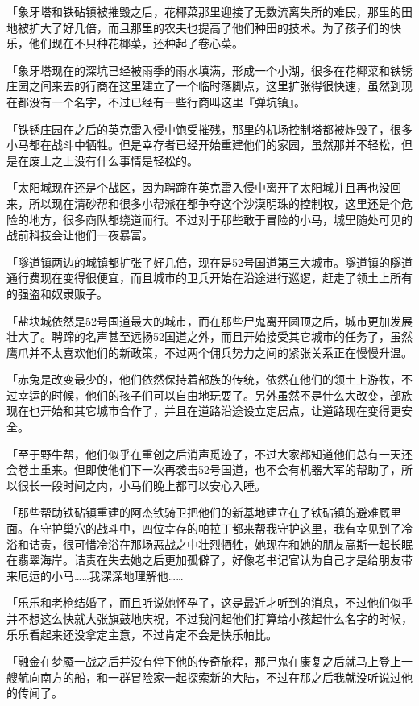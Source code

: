 {「象牙塔和铁砧镇被摧毁之后，花椰菜那里迎接了无数流离失所的难民，那里的田地被扩大了好几倍，而且那里的农夫也提高了他们种田的技术。为了孩子们的快乐，他们现在不只种花椰菜，还种起了卷心菜。

「象牙塔现在的深坑已经被雨季的雨水填满，形成一个小湖，很多在花椰菜和铁锈庄园之间来去的行商在这里建立了一个临时落脚点，这里扩张得很快速，虽然到现在都没有一个名字，不过已经有一些行商叫这里『弹坑镇』。

「铁锈庄园在之后的英克雷入侵中饱受摧残，那里的机场控制塔都被炸毁了，很多小马都在战斗中牺牲。但是幸存者已经开始重建他们的家园，虽然那并不轻松，但是在废土之上没有什么事情是轻松的。

「太阳城现在还是个战区，因为聘蹄在英克雷入侵中离开了太阳城并且再也没回来，所以现在清砂帮和很多小帮派在都争夺这个沙漠明珠的控制权，这里还是个危险的地方，很多商队都绕道而行。不过对于那些敢于冒险的小马，城里随处可见的战前科技会让他们一夜暴富。

「隧道镇两边的城镇都扩张了好几倍，现在是52号国道第三大城市。隧道镇的隧道通行费现在变得很便宜，而且城市的卫兵开始在沿途进行巡逻，赶走了领土上所有的强盗和奴隶贩子。

「盐块城依然是52号国道最大的城市，而在那些尸鬼离开圆顶之后，城市更加发展壮大了。聘蹄的名声甚至远扬52国道之外，而且开始接受其它城市的任务了，虽然鹰爪并不太喜欢他们的新政策，不过两个佣兵势力之间的紧张关系正在慢慢升温。

「赤兔是改变最少的，他们依然保持着部族的传统，依然在他们的领土上游牧，不过幸运的时候，他们的孩子们可以自由地玩耍了。另外虽然不是什么大改变，部族现在也开始和其它城市合作了，并且在道路沿途设立定居点，让道路现在变得更安全。

「至于野牛帮，他们似乎在重创之后消声觅迹了，不过大家都知道他们总有一天还会卷土重来。但即使他们下一次再袭击52号国道，也不会有机器大军的帮助了，所以很长一段时间之内，小马们晚上都可以安心入睡。

「那些帮助铁砧镇重建的阿杰铁骑卫把他们的新基地建立在了铁砧镇的避难厩里面。在守护巢穴的战斗中，四位幸存的帕拉丁都来帮我守护这里，我有幸见到了冷浴和诘责，很可惜冷浴在那场恶战之中壮烈牺牲，她现在和她的朋友高斯一起长眠在翡翠海岸。诘责在失去她之后更加孤僻了，好像老书记官认为自己才是给朋友带来厄运的小马……我深深地理解他……

「乐乐和老枪结婚了，而且听说她怀孕了，这是最近才听到的消息，不过他们似乎并不想这么快就大张旗鼓地庆祝，不过我问起他们打算给小孩起什么名字的时候，乐乐看起来还没拿定主意，不过肯定不会是快乐帕比。

「融金在梦魇一战之后并没有停下他的传奇旅程，那尸鬼在康复之后就马上登上一艘航向南方的船，和一群冒险家一起探索新的大陆，不过在那之后我就没听说过他的传闻了。

}
